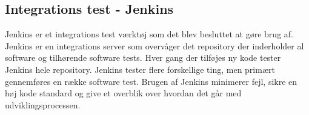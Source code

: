 \subsection*{Integrations test - Jenkins}
Jenkins er et integrations test værktøj som det blev besluttet at gøre brug af. Jenkins er en integrations server som overvåger det repository der inderholder al software og tilhørende software tests. Hver gang der tilføjes ny kode tester Jenkins hele repository. Jenkins tester flere forskellige ting, men primært gennemføres en række software test. Brugen af Jenkins minimerer fejl, sikre en høj kode standard og give et overblik over hvordan det går med udviklingsprocessen.  